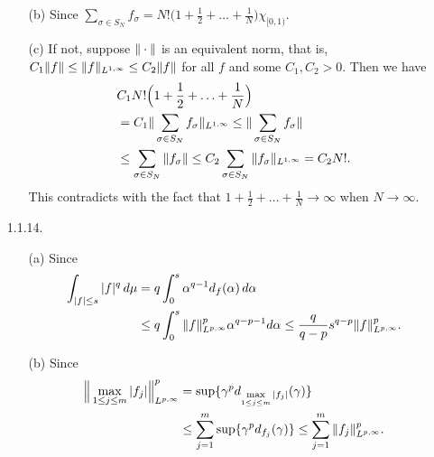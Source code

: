 \begin{enumerate}
\begin{enumerate}
    \item[(b)] Since $\sum\limits_{\sigma \in S_{N}}f_{\sigma}
    =N!\big(1+\frac{1}{2}+\ldots+\frac{1}{N}\big)\chi_{[0,1)}$.

    \item[(c)] If not, suppose $\norm{\cdot}$ is an equivalent norm, 
    that is, $C_{1}\norm{f} \leq \norm{f}_{L^{1,\infty}} \leq C_{2}\norm{f}$ 
    for all $f$ and some $C_{1},C_{2}>0$. Then we have
    \begin{equation*}\begin{aligned}
    &C_{1}N!\Big(1+\dfrac{1}{2}+\ldots+\dfrac{1}{N}\Big)\\
    &=C_{1}\norm{\sum_{\sigma \in S_{N}}f_{\sigma}}_{L^{1,\infty}} 
    \leq \norm{\sum_{\sigma \in S_{N}}f_{\sigma}} \\ 
    &\leq \sum_{\sigma \in S_{N}}\norm{f_{\sigma}}
    \leq C_{2}\sum_{\sigma \in S_{N}}\norm{f_{\sigma}}_{L^{1,\infty}}=C_{2}N!.
    \end{aligned}\end{equation*}
    This contradicts with the fact that $1+\frac{1}{2}+\dots+\frac{1}{N}\rightarrow\infty$ when $N\rightarrow\infty$.
    \end{enumerate}

\item[1.1.14.]
    \begin{enumerate}
    \item[(a)] Since
    \begin{equation*}\begin{aligned}
    \int_{|f| \leq s}|f|^{q}\,d\mu 
    &= q \int_{0}^{s}\alpha^{q-1}d_{f}(\alpha)\,d\alpha \\
    &\leq q \int_{0}^{s}\Vert f \Vert_{L^{p,\infty}}^{p}\alpha^{q-p-1}d\alpha
    \leq \frac{q}{q-p}s^{q-p}\Vert f \Vert_{L^{p,\infty}}^{p}.
    \end{aligned}\end{equation*}

    \item[(b)] Since
    \begin{equation*}\begin{aligned}
    \Big\|\max\limits_{1 \leq j \leq m}|f_{j}|\Big\|_{L^{p,\infty}}^{p} 
    &= \sup\{\gamma^{p}d_{\max\limits_{1 \leq j \leq m}|f_{j}|}(\gamma)\} \\
    &\leq \sum_{j=1}^{m}\sup\{\gamma^{p}d_{f_{j}}(\gamma)\}
    \leq \sum_{j=1}^{m}\Vert f_{j} \Vert_{L^{p,\infty}}^{p}.
    \end{aligned}\end{equation*}
    \end{enumerate}


\end{enumerate}
